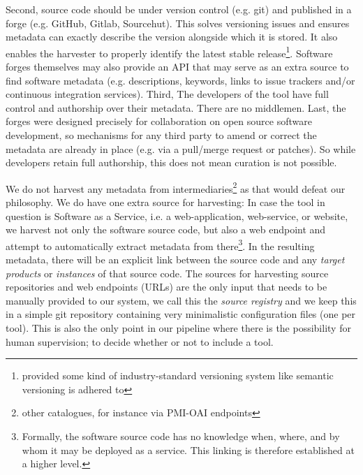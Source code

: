\documentclass[a4paper,11pt]{article}
\begin{document}
  Second, source code should be under version control (e.g. git) and published in a forge (e.g. GitHub, Gitlab, Sourcehut).
  This solves versioning issues and ensures metadata can exactly describe the version alongside which it is stored. It also enables the 
  harvester to properly identify the latest stable release\footnote{provided some kind of industry-standard versioning system like semantic versioning is adhered to}.
  Software forges themselves may also provide an API that may serve as an extra source to find software metadata (e.g. descriptions, keywords, links to issue trackers and/or continuous integration services).
  Third, The developers of the tool have full control and authorship over their metadata. There are no middlemen.
  Last, the forges were designed precisely for collaboration on open source software development, so mechanisms for any
  third party to amend or correct the metadata are already in place (e.g. via a pull/merge request or patches).
  So while developers retain full authorship, this does not mean curation is not possible.

We do not harvest any metadata from intermediaries\footnote{other catalogues, for instance via PMI-OAI
endpoints} as that would defeat our philosophy. We do have one extra source for
harvesting: In case the tool in question is Software as a Service, i.e. a
web-application, web-service, or website, we harvest not only the software
source code, but also a web endpoint and attempt to automatically extract
metadata from there\footnote{Formally, the software source code has
no knowledge when, where, and by whom it may be deployed as a service. This linking is
therefore established at a higher level.}. In the resulting metadata, there will be an explicit link
between the source code and any \emph{target products} or \emph{instances} of
that source code. The sources for harvesting source repositories and web
endpoints (URLs) are the only input that needs to be manually provided to our
system, we call this the \emph{source registry} and we keep this in a simple
git repository containing very minimalistic configuration files (one per tool).
This is also the only point in our pipeline where there is the possibility for
human supervision; to decide whether or not to include a tool.
\end{document}
